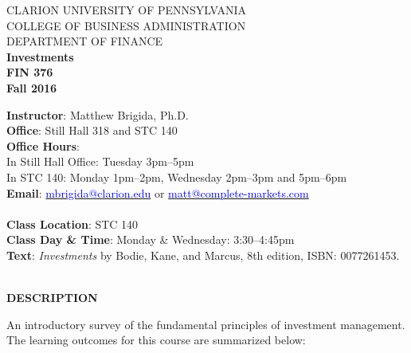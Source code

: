 \documentclass{article}
\begin{document}
\begin{center}
CLARION UNIVERSITY OF PENNSYLVANIA\\
COLLEGE OF BUSINESS ADMINISTRATION\\
DEPARTMENT OF FINANCE
\\
{\bf Investments}\\
{\bf FIN 376}\\
{\bf Fall 2016}\\
\end{center}
\vspace*{5pt}
{\bf Instructor}: Matthew Brigida, Ph.D. \\
{\bf Office}: Still Hall 318 and STC 140\\
{\bf Office Hours}: \\
In Still Hall Office: Tuesday 3pm--5pm \\
In STC 140: Monday 1pm--2pm, Wednesday 2pm--3pm and 5pm--6pm\\
{\bf Email}: 
\href{mailto:mbrigida@clarion.edu}{\textcolor{blue}{mbrigida@clarion.edu}} or \href{mailto:matt@complete-markets.com}{\textcolor{blue}{matt@complete-markets.com}} \\
\\
{\bf Class Location}:  STC 140\\
{\bf Class Day \& Time}: Monday \& Wednesday: 3:30--4:45pm
\\
{\bf Text}: {\it Investments} by Bodie, Kane, and Marcus, 8th edition, ISBN: 0077261453.
\\
\\
\begin{center}
{\bf DESCRIPTION}
\end{center}  
An introductory survey of the fundamental principles of investment management.
The learning outcomes for this course are summarized below:
\end{document}
